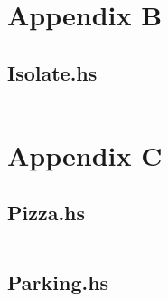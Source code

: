 \documentclass[english,a4paper,]{report}
\begin{document}
\inputminted{java}{code_samples/SelectionSort.java}

\chapter{Appendix B}\label{appendix-b}

\section{Isolate.hs}\label{isolate.hs}

\inputminted{haskell}{code_samples/Isolate.hs}

\chapter{Appendix C}\label{appendix-c}

\section{Pizza.hs}\label{pizza.hs}

\inputminted{haskell}{code_samples/Pizza.hs}

\section{Parking.hs}\label{parking.hs}

\inputminted{haskell}{code_samples/Parking.hs}
\end{document}
